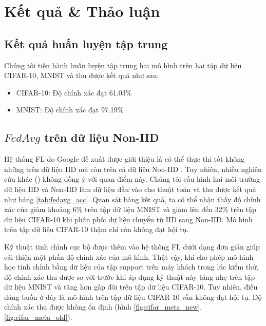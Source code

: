 \chapter{Kết quả \& Thảo luận}
\label{Chapter5}

\section{Kết quả huấn luyện tập trung}

Chúng tôi tiến hành huấn luyện tập trung hai mô hình trên hai tập dữ liệu CIFAR-10, MNIST và thu được kết quả như sau:

\begin{itemize}
    \item CIFAR-10: Độ chính xác đạt 61.03\%
    \item MNIST: Độ chính xác đạt 97.19\%
\end{itemize}

\section{$FedAvg$ trên dữ liệu Non-IID}

Hệ thống FL do Google đề xuất được giới thiệu là có thể thực thi tốt không những trên dữ liệu IID mà còn trên cả dữ liệu Non-IID \cite{mcmahan2017communication}. Tuy nhiên, nhiều nghiên cứu khác (\parencite{chen2018federated, zhao2018federated, zhu2021federated, wang2019federated}) không đồng ý với quan điểm này. Chúng tôi cấu hình hai môi trường dữ liệu IID và Non-IID làm dữ liệu đầu vào cho thuật toán  và thu được kết quả như bảng \ref{tab:fedavg_acc}. Quan sát bảng kết quả, ta có thể nhận thấy độ chính xác của  giảm khoảng 6\% trên tập dữ liệu MNIST và giảm lên đến 32\% trên tập dữ liệu CIFAR-10 khi phân phối dữ liệu chuyển từ IID sang Non-IID. Mô hình trên tập dữ liệu CIFAR-10 thậm chí còn không đạt hội tụ.

Kỹ thuật tinh chỉnh cục bộ được thêm vào hệ thống FL dưới dạng đơn giản giúp cải thiện một phần độ chính xác của mô hình. Thật vậy, khi cho phép mô hình học tinh chỉnh bằng dữ liệu của tập support trên máy khách trong lúc kiểm thử, độ chính xác thu được so với trước khi áp dụng kỹ thuật này tăng nhẹ trên tập dữ liệu MNIST và tăng hơn gấp đôi trên tập dữ liệu CIFAR-10. Tuy nhiên, điều đáng buồn ở đây là mô hình trên tập dữ liệu CIFAR-10 vẫn không đạt hội tụ. Độ chính xác thu được không ổn định (hình \ref{fig:cifar_meta_new}, \ref{fig:cifar_meta_old}).

